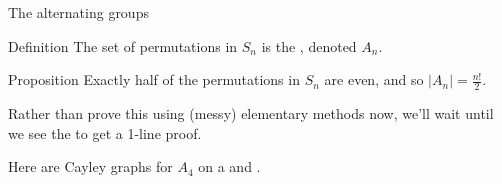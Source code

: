 \documentclass[8pt, handout]{beamer}
\newcommand{\Pause}{}
\begin{document}
\begin{frame}{The alternating groups} \smallskip

  \begin{block}{Definition}
    The set of  permutations in $S_n$ is the , denoted $A_n$.
  \end{block}

  \Pause
  
  \begin{block}{Proposition}
    Exactly half of the permutations in $S_n$ are even, and so 
    $\displaystyle |A_n|=\tfrac{n!}{2}$.
  \end{block}

  \smallskip\Pause
  
  Rather than prove this using (messy) elementary methods now, we'll
  wait until we see the  to get a 1-line
  proof. \medskip\Pause
  
  Here are Cayley graphs for $A_4$ on a  and
  .
  

\end{frame}
\end{document}
